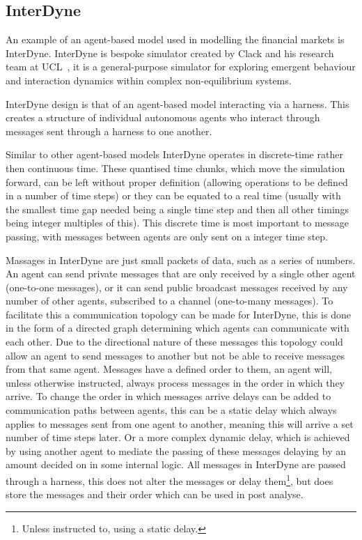 \documentclass{article}
\begin{document}
\subsection{InterDyne} \label{InterDyne_section}
An example of an agent-based model used in modelling the financial markets is InterDyne. InterDyne is bespoke simulator created by Clack and his research team at UCL~\cite{Chris_webPage}, it is a general-purpose simulator for exploring emergent behaviour and interaction dynamics within complex non-equilibrium systems.

InterDyne design is that of an agent-based model interacting via a harness. This creates a structure of individual autonomous agents who interact through messages sent through a harness to one another.
 
Similar to other agent-based models InterDyne operates in discrete-time rather then continuous time. These quantised time chunks, which move the simulation forward, can be left without proper definition (allowing operations to be defined in a number of time steps) or they can be equated to a real time (usually with the smallest time gap needed being a single time step and then all other timings being integer multiples of this). This discrete time is most important to message passing, with messages between agents are only sent on a integer time step.

Massages in InterDyne are just small packets of data, such as a series of numbers. An agent can send private messages that are only received by a single other agent (one-to-one messages), or it can send public broadcast messages received by any number of other agents, subscribed to a channel (one-to-many messages). To facilitate this a communication topology can be made for InterDyne, this is done in the form of a directed graph determining which agents can communicate with each other. Due to the directional nature of these messages this topology could allow an agent to send messages to another but not be able to receive messages from that same agent. Messages have a defined order to them, an agent will, unless otherwise instructed, always process messages in the order in which they arrive. To change the order in which messages arrive delays can be added to communication paths between agents, this can be a static delay which always applies to messages sent from one agent to another, meaning this will arrive a set number of time steps later. Or a more complex dynamic delay, which is achieved by using another agent to mediate the passing of these messages delaying by an amount decided on in some internal logic. All messages in InterDyne are passed through a harness, this does not alter the messages or delay them\footnote{Unless instructed to, using a static delay.}, but does store the messages and their order which can be used in post analyse.
        
\end{document}
